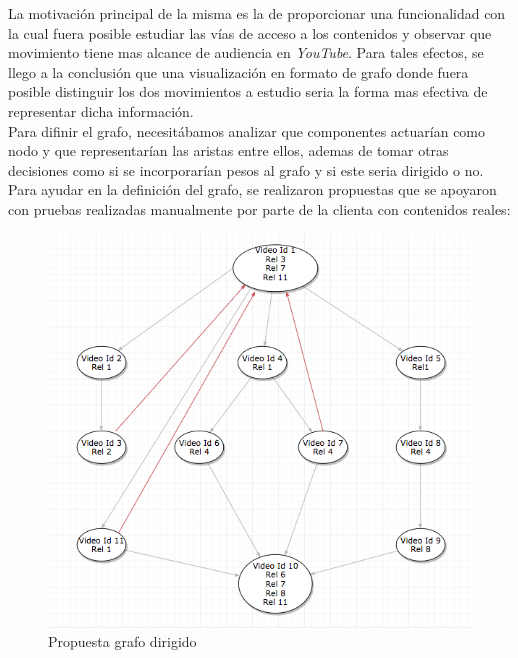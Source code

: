 \documentclass[11pt,a4paper]{article}
\begin{document}
La motivación principal de la misma es la de proporcionar una funcionalidad con la cual fuera posible estudiar las vías de acceso a los contenidos y observar que movimiento tiene mas alcance de audiencia en \textit{YouTube}. Para tales efectos, se llego a la conclusión que una visualización en formato de grafo donde fuera posible distinguir los dos movimientos a estudio seria la forma mas efectiva de representar dicha información.
\\

Para difinir el grafo, necesitábamos analizar que componentes actuarían como nodo y que representarían las aristas entre ellos, ademas de tomar otras decisiones como si se incorporarían pesos al grafo y si este seria dirigido o no. Para ayudar en la definición del grafo, se realizaron propuestas que se apoyaron con pruebas realizadas manualmente por parte de la clienta con contenidos reales:

\begin{figure}[H]
\centering
\includegraphics[scale=0.40]{grafo/propuesta1.png}
\caption{Propuesta grafo dirigido}
\end{figure}
\end{document}
